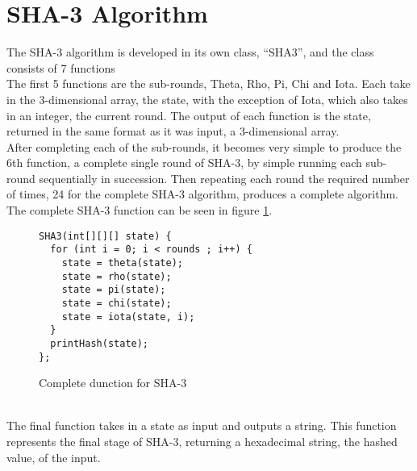 \section{SHA-3 Algorithm}
The SHA-3 algorithm is developed in its own class, ``SHA3'', and the class consists of 7 functions
\vspace{5mm}\\
The first 5 functions are the sub-rounds, Theta, Rho, Pi, Chi and Iota. Each take in the 3-dimensional array, the state, with the exception of Iota, which also takes in an integer, the current round. The output of each function is the state, returned in the same format as it was input, a 3-dimensional array.
\vspace{5mm}\\
After completing each of the sub-rounds, it becomes very simple to produce the 6th function, a complete single round of SHA-3, by simple running each sub-round sequentially in succession. Then repeating each round the required number of times, 24 for the complete SHA-3 algorithm, produces a complete algorithm. The complete SHA-3 function can be seen in figure \ref{fig:completeSHA-3}.
\begin{figure}[h!]
\centering
\begin{lstlisting}
SHA3(int[][][] state) {
  for (int i = 0; i < rounds ; i++) {
    state = theta(state);
    state = rho(state);
    state = pi(state);
    state = chi(state);
    state = iota(state, i);
  }
  printHash(state);
};
\end{lstlisting}
\caption{Complete dunction for SHA-3}
\label{fig:completeSHA-3}
\end{figure}
\vspace{5mm}\\
The final function takes in a state as input and outputs a string. This function represents the final stage of SHA-3, returning a hexadecimal string, the hashed value, of the input.
